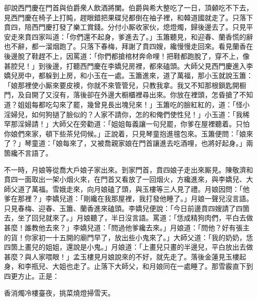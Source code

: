 卻說西門慶在門首與伯爵衆人飲酒將闌。伯爵與希大整吃了一日，頂顙吃不下去，見西門慶在椅子上打盹，趕眼錯把果碟兒都倒在袖子裡，{}和韓道國就走了。只落下賁四，陪西門慶打發了樂工賞錢。分付小厮收家伙，熄燈燭，歸後邊去了。只見平安走來賁四家叫道：「你們還不起身，爹進去了。」玉簫聽見，和迎春、蘭香慌的辭也不辭，都一溜烟跑了。只落下春梅，拜謝了賁四嫂，纔慢慢走回來。{}看見蘭香在後邊脫了鞋趕不上，因罵道：「你們都搶棺材奔命哩！把鞋都跑脫了，穿不上，像甚腔兒！」到後邊，打聽西門慶在李嬌兒房裡，都來磕頭。大師父見西門慶進入李嬌兒房中，都躲到上房，和小玉在一處。玉簫進來，道了萬福，那小玉就說玉簫：「娘那裡使小厮來要皮襖，你就不來管管兒，只教我拿。我又不知那根鎻匙開橱門，及自開了又沒有，落後卻在外邊大橱櫃裡尋出來。你放在裡頭，怎昏搶了不知道？姐姐每都吃勾來了罷，幾曾見長出塊兒來！」玉簫吃的臉紅紅的，道：「怪小淫婦兒，如何狗撾了臉似的？人家不請你，怎的和俺們使性兒！」小玉道：「我稀罕那淫婦請！」{}大師父在旁勸道：「姐姐每義讓一句兒罷，你爹在屋裡聽着。只怕你娘們來家，頓下些茶兒伺候。」正說着，只見琴童抱進氊包來。玉簫便問：「娘來了？」琴童道：「娘每來了，又被喬親家娘在門首讓進去吃酒哩，也將好起身。」兩箇纔不言語了。

不一時，月娘等從喬大戶娘子家出來。到家門首，賁四娘子走出來厮見。陳敬濟和賁四一面取出一架小烟火來，在門首又看放了一回烟火，方纔進來，與李嬌兒、大師父道了萬福。雪娥走來，向月娘磕了頭，與玉樓等三人見了禮。月娘因問：「他爹在那裡？」李嬌兒道：「剛纔在我那屋裡，我打發他睡了。」月娘一聲兒沒言語。只見春梅、迎春、玉簫、蘭香進來磕頭。李嬌兒便說：「今日前邊賁四嫂請了四箇去，坐了回兒就來了。」月娘聽了，半日沒言語。罵道：「恁成精狗肉們，平白去做甚麼！誰教他去來？」李嬌兒道：「問過他爹纔去來。」月娘道：「問他？好有張主的貨！你家初一十五開的廟門早了，放出些小鬼來了。」大師父道：「我的奶奶，恁四箇上畫兒的姐姐，還說是小鬼。」月娘道：「上畫兒只畫的半邊兒，平白放出去做甚麼？與人家喂眼！」孟玉樓見月娘說來的不好，就先走了。落後金蓮見玉樓起身，和李瓶兒、大姐也走了。止落下大師父，和月娘同在一處睡了。那雪霰直下到四更方止。正是：

\begin{myquote}
香消燭冷樓臺夜，挑菜燒燈掃雪天。
\end{myquote}

